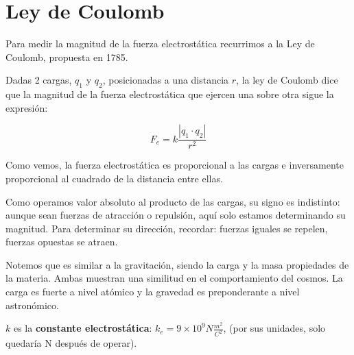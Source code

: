 \section{Ley de Coulomb}

Para medir la magnitud de la fuerza electrostática
recurrimos a la Ley de Coulomb, propuesta en 1785.

Dadas 2 cargas,
\(q_1\) y \(q_2\),
posicionadas a una distancia \(r\),
la ley de Coulomb dice que la magnitud de la fuerza electrostática 
que ejercen una sobre otra sigue la expresión:

\vspace{.3cm}
\begin{equation}
    F_e = k\frac{|q_1\cdot q_2|}{r^{2}}
\end{equation}
\vspace{.3cm}

Como vemos,
la fuerza electrostática es proporcional a las cargas
e inversamente proporcional al cuadrado de la distancia entre ellas.

Como operamos valor absoluto al producto de las cargas,
su signo es indistinto:
aunque sean fuerzas de atracción o repulsión,
aquí solo estamos determinando su magnitud.
Para determinar su dirección, recordar:
fuerzas iguales se repelen,
fuerzas opuestas se atraen.

Notemos que es similar a la gravitación,
siendo la carga y la masa propiedades de la materia.
Ambas muestran una similitud en el comportamiento del cosmos.
La carga es fuerte a nivel atómico y la gravedad es preponderante a nivel astronómico.

\(k\) es la \textbf{constante electrostática}:
\(k_e = 9 \times 10^{9} N \frac{m^{2}}{C^{2}}\),
(por sus unidades, solo quedaría N después de operar).
